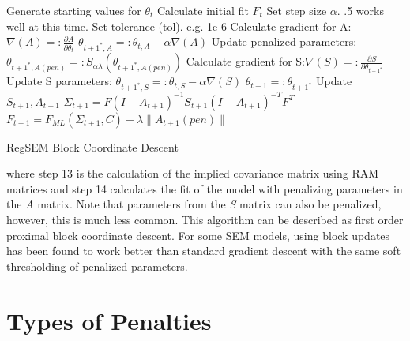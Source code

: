 \documentclass[article]{jss}
\begin{document}
\begin{minipage}{\textwidth}
    \begin{algorithm}[H]
        \begin{algorithmic}[1]
            \State Generate starting values for $\theta_{t}$
            \State Calculate initial fit $F_{t}$
            \State Set step size $\alpha$. .5 works well at this time.
            \State Set tolerance (tol). e.g. 1e-6
            \State Calculate gradient for A:$ \nabla (A) =:  \frac{\partial A}{\partial \theta_{t}}$
            \State $ \theta_{t+1^{*},A} =: \theta_{t,A} - \alpha \nabla(A)$
            \State  Update penalized parameters: $\theta_{t+1^{*},A(pen)} =: S_{\alpha \lambda}(\theta_{t+1^{*},A(pen)})$
            \State Calculate gradient for S:$ \nabla (S) =:  \frac{\partial S}{\partial \theta_{t+1^{*}}}$ 
            \State Update S parameters: $ \theta_{t+1^{*},S} =: \theta_{t,S} - \alpha \nabla(S)$
            \State $\theta_{t+1} =: \theta_{t+1^{*}}$ %
            \State Update $S_{t+1}, A_{t+1}$
            \State $ \Sigma_{t+1} = F(I-A_{t+1})^{-1}S_{t+1}(I-A_{t+1})^{-T}F^{T}$
            \State $ F_{t+1} = F_{ML}(\Sigma_{t+1},C) + \lambda \| A_{t+1}(pen) \|$
            \EndWhile
        \end{algorithmic}
        \caption{RegSEM Block Coordinate Descent}
        \label{alg:seq}
    \end{algorithm}
\end{minipage}

\noindent
where step 13 is the calculation of the implied covariance matrix using
RAM matrices and step 14 calculates the fit of the model with penalizing
parameters in the \textit{A} matrix. Note that parameters from the
\textit{S} matrix can also be penalized, however, this is much less
common. This algorithm can be described as first order proximal block
coordinate descent. For some SEM models, using block updates has been
found to work better than standard gradient descent with the same soft
thresholding of penalized parameters.

\section{Types of Penalties}\label{types-of-penalties}
\end{document}
